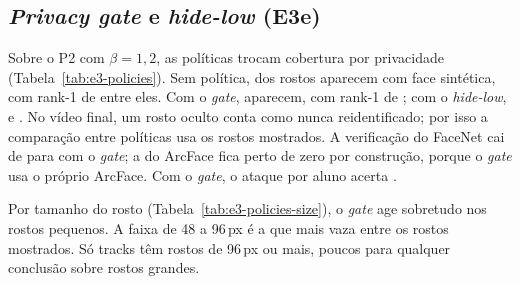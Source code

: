\begin{table}[ht]\centering
\caption{E3m: rank-1 com só o miolo do rosto ou só o contexto no recorte alinhado, no rosto real e nas trocas (rostos trocados).}
\label{tab:e3-where}
\resizebox{\linewidth}{!}{}
\fonteautor
\end{table}

\subsection{\emph{Privacy gate} e \emph{hide-low} (E3e)}

Sobre o P2 com $\beta = 1{,}2$, as políticas trocam cobertura por privacidade (Tabela~\ref{tab:e3-policies}). Sem política,  dos rostos aparecem com face sintética, com rank-1 de  entre eles. Com o \emph{gate},  aparecem, com rank-1 de ; com o \emph{hide-low},  e . No vídeo final, um rosto oculto conta como nunca reidentificado; por isso a comparação entre políticas usa os rostos mostrados. A verificação do FaceNet cai de  para  com o \emph{gate}; a do ArcFace fica perto de zero por construção, porque o \emph{gate} usa o próprio ArcFace. Com o \emph{gate}, o ataque por aluno acerta .

Por tamanho do rosto (Tabela~\ref{tab:e3-policies-size}), o \emph{gate} age sobretudo nos rostos pequenos. A faixa de 48 a 96\,px é a que mais vaza entre os rostos mostrados. Só  tracks têm rostos de 96\,px ou mais, poucos para qualquer conclusão sobre rostos grandes.

\begin{table}[ht]\centering
\caption{E3e: políticas sobre P2 $\beta$ 1,2.}
\label{tab:e3-policies}

\fonteautor
\end{table}

\begin{table}[ht]\centering
\caption{E3e: FaceNet rank-1 entre os rostos mostrados, por tamanho do rosto; primeira linha: tracks com rostos na faixa.}
\label{tab:e3-policies-size}

\fonteautor
\end{table}

